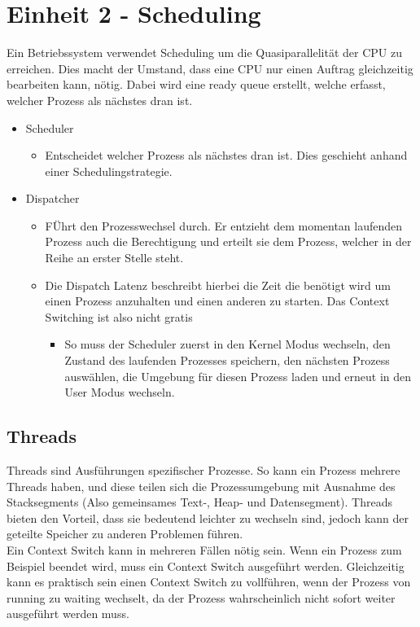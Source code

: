 \documentclass{article}
\begin{document}
	\section{Einheit 2 - Scheduling}
	Ein Betriebssystem verwendet Scheduling um die Quasiparallelität der CPU zu erreichen. Dies macht der Umstand, dass eine CPU nur einen Auftrag gleichzeitig bearbeiten kann, nötig. Dabei wird eine ready queue erstellt, welche erfasst, welcher Prozess als nächstes dran ist. \\
	\begin{itemize}
		\item{Scheduler}
		\begin{itemize}
			\item{Entscheidet welcher Prozess als nächstes dran ist. Dies geschieht anhand einer Schedulingstrategie.}
		\end{itemize}
		\item{Dispatcher}
		\begin{itemize}
			\item{FÜhrt den Prozesswechsel durch. Er entzieht dem momentan laufenden Prozess auch die Berechtigung und erteilt sie dem Prozess, welcher in der Reihe an erster Stelle steht.}
			\item{Die Dispatch Latenz beschreibt hierbei die Zeit die benötigt wird um einen Prozess anzuhalten und einen anderen zu starten. Das Context Switching ist also nicht gratis}
			\begin{itemize}
				\item{So muss der Scheduler zuerst in den Kernel Modus wechseln, den Zustand des laufenden Prozesses speichern, den nächsten Prozess auswählen, die Umgebung für diesen Prozess laden und erneut in den User Modus wechseln.}
			\end{itemize}
		\end{itemize}
	\end{itemize}
	\subsection{Threads}
	Threads sind Ausführungen spezifischer Prozesse. So kann ein Prozess mehrere Threads haben, und diese teilen sich die Prozessumgebung mit Ausnahme des Stacksegments (Also gemeinsames Text-, Heap- und Datensegment). Threads bieten den Vorteil, dass sie bedeutend leichter zu wechseln sind, jedoch kann der geteilte Speicher zu anderen Problemen führen. \\
	Ein Context Switch kann in mehreren Fällen nötig sein. Wenn ein Prozess zum Beispiel beendet wird, muss ein Context Switch ausgeführt werden. Gleichzeitig kann es praktisch sein einen Context Switch zu vollführen, wenn der Prozess von running zu waiting wechselt, da der Prozess wahrscheinlich nicht sofort weiter ausgeführt werden muss. \\
\end{document}
